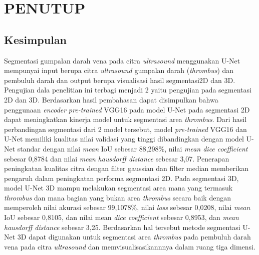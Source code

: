 \chapter{PENUTUP}
\label{sec:chap5_tutup}
\vspace{1ex}
\section*{}
 \vspace{1ex}

\section{Kesimpulan}
\label{sec:sec4_kesimpulan}
\vspace{1ex}
Segmentasi gumpalan darah vena pada citra \textit{ultrasound} menggunakan U-Net mempunyai input berupa citra \textit{ultrasound} gumpalan darah (\textit{thrombus}) dan pembuluh darah dan output berupa visualisasi hasil segmentasi2D dan 3D. Pengujian dala penelitian ini terbagi menjadi 2 yaitu pengujian pada segmentasi 2D dan 3D. Berdasarkan hasil pembahasan dapat disimpulkan bahwa penggunaan \textit{encoder} \textit{pre-trained} VGG16 pada model U-Net pada segmentasi 2D dapat meningkatkan kinerja model untuk segmentasi area \textit{thrombus}. Dari hasil perbandingan segmentasi dari 2 model tersebut, model \textit{pre-trained} VGG16 dan U-Net memiliki kualitas nilai validasi yang tinggi dibandingkan dengan model U-Net standar dengan nilai \textit{mean} IoU sebesar 88,298\%, nilai \textit{mean dice coefficient} sebesar 0,8784 dan nilai \textit{mean} \textit{hausdorff distance} sebesar 3,07.  Penerapan peningkatan kualitas citra dengan filter gaussian dan filter median memberikan pengaruh dalam peningkatan performa segmentasi 2D. Pada segmentasi 3D, model U-Net 3D mampu melakukan segmentasi area mana yang termasuk \textit{thrombus} dan mana bagian yang bukan area \textit{thrombus} secara baik dengan memperoleh nilai akurasi sebesar 99,1078\%, nilai \textit{loss} sebesar 0,0208, nilai \textit{mean} IoU sebesar 0,8105, dan nilai mean \textit{dice coefficient} sebesar 0,8953, dan \textit{mean} \textit{hausdorff distance} sebesar 3,25. Berdasarkan hal tersebut metode segmentasi U-Net 3D dapat digunakan untuk segmentasi area \textit{thrombus} pada pembuluh darah vena pada citra \textit{ultrasound} dan memvisualisasikannnya dalam ruang tiga dimensi.

